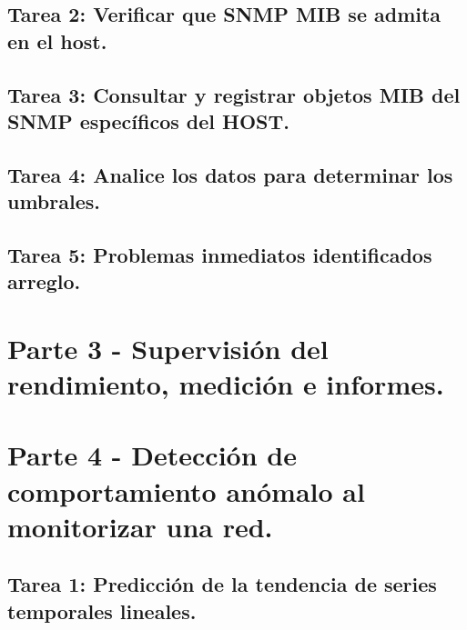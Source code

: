 \documentclass[oneside,10pt]{book}
\begin{document}
\subsection{Tarea 2: Verificar que SNMP MIB se admita en el host.}

\subsection{Tarea 3: Consultar y registrar objetos MIB del SNMP específicos del HOST.}

\subsection{Tarea 4: Analice los datos para determinar los umbrales.}

\subsection{Tarea 5: Problemas inmediatos identificados arreglo.}


\section{Parte 3 - Supervisión del rendimiento, medición e informes.}



\section{Parte 4 - Detección de comportamiento anómalo al monitorizar una red.}

\subsection{Tarea 1: Predicción de la tendencia de series temporales lineales.}
\end{document}
